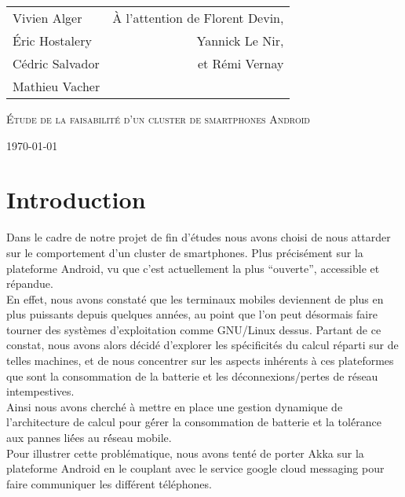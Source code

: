 \documentclass[a4paper,12pt]{article}
\begin{document}
\begin{titlepage}

\addtolength{\oddsidemargin}{-0.15in}
\addtolength{\textwidth}{0.5in}
\addtolength{\topmargin}{-.375in}
\addtolength{\textheight}{0.75in}

\begin{center}

\begin{tabular*}{6in}{l@{\extracolsep{\fill}}r}{Vivien Alger}&{À
    l'attention de Florent Devin,}\\
    {Éric Hostalery}&{Yannick Le Nir,}\\
    {Cédric Salvador}&{et Rémi Vernay}\\
    {Mathieu Vacher}
\end{tabular*}
\vspace*{\fill}

\textsc{\LARGE Étude de la faisabilité
d'un cluster de smartphones Android}\\
\vspace*{\fill}

\today
\end{center}

\end{titlepage}

\tableofcontents
\newpage

\pagestyle{fancy}
\fancyhf{}
\fancyhead[R]{\thepage}
\renewcommand{\footrulewidth}{1pt}
\renewcommand{\headrulewidth}{1pt}
  
\section*{Introduction}
Dans le cadre de notre projet de fin d’études nous avons choisi de nous 
attarder sur le comportement d’un cluster de smartphones. Plus précisément
sur la plateforme Android, vu que c’est actuellement la plus “ouverte”, 
accessible et répandue.\\
En effet, nous avons constaté que les terminaux mobiles deviennent de plus en 
plus puissants depuis quelques années, au point que l’on peut désormais faire 
tourner des systèmes d’exploitation comme GNU/Linux dessus. Partant de ce 
constat, nous avons alors décidé d’explorer les spécificités du calcul réparti
sur de telles machines, et de nous concentrer sur les aspects inhérents à ces 
plateformes que sont la consommation de la batterie et les déconnexions/pertes
 de réseau intempestives.\\
Ainsi nous avons cherché à mettre en place une gestion dynamique de 
l’architecture de calcul pour gé́rer la consommation de batterie et la tolé́rance
aux pannes lié́es au ré́seau mobile.\\
Pour illustrer cette problématique, nous avons tenté de porter
Akka sur la plateforme Android en le couplant avec le service google cloud 
messaging pour faire communiquer les différent téléphones.
\newpage
\end{document}
